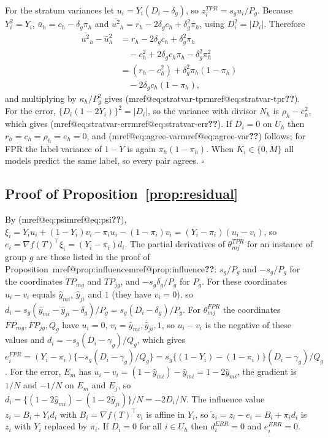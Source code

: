 \documentclass[pdflatex,sn-mathphys-num,iicol]{sn-jnl}
\makeatletter
\theoremstyle{thmstyleone}
\theoremstyle{thmstyletwo}
\theoremstyle{thmstylethree}
\newcommand{\Mref}[1]{\ifcsname mref@#1\endcsname\csname mref@#1\endcsname\else\textbf{??}\fi}
\makeatother
\begin{document}
For the stratum variances let $u_i=Y_i(D_i-\delta_g)$, so $z^{TPR}_i=s_gu_i/P_g$. Because
$Y_i^2=Y_i$, $\bar u_h=c_h-\delta_g\pi_h$ and $\overline{u^2}_h=r_h-2\delta_gc_h+\delta_g^2\pi_h$,
using $D_i^2=|D_i|$. Therefore
\begin{align*}
\overline{u^2}_h-\bar u_h^2&=r_h-2\delta_gc_h+\delta_g^2\pi_h\\
&\quad-c_h^2+2\delta_gc_h\pi_h-\delta_g^2\pi_h^2\\
&=(r_h-c_h^2)+\delta_g^2\pi_h(1-\pi_h)\\
&\quad-2\delta_gc_h(1-\pi_h),
\end{align*}
and multiplying by $\kappa_h/P_g^2$ gives (\Mref{eq:stratvar-tpr}). For the error,
$\{D_i(1-2Y_i)\}^2=|D_i|$, so the variance with divisor $N_h$ is $\rho_h-e_h^2$, which gives
(\Mref{eq:stratvar-err}). If $D_i=0$ on $U_h$ then $r_h=c_h=\rho_h=e_h=0$, and (\Mref{eq:agree-var})
follows; for FPR the label variance of $1-Y$ is again $\pi_h(1-\pi_h)$. When $K_i\in\{0,M\}$ all
models predict the same label, so every pair agrees. $\square$

\subsection{Proof of Proposition~\ref{prop:residual}}

By (\Mref{eq:psi}), $\xi_i=Y_iu_i+(1-Y_i)v_i-\pi_iu_i-(1-\pi_i)v_i=(Y_i-\pi_i)(u_i-v_i)$, so $e_i=\nabla f(T)^\top\xi_i=(Y_i-\pi_i)d_i$. The partial derivatives of
$\theta^{TPR}_{mj}$ for an instance of group $g$ are those listed in the proof of Proposition~\Mref{prop:influence}: $s_g/P_g$ and $-s_g/P_g$ for the coordinates $TP_{mg}$ and
$TP_{jg}$, and $-s_g\delta_g/P_g$ for $P_g$. For these coordinates $u_i-v_i$ equals $\hat y_{mi}$, $\hat y_{ji}$ and $1$ (they have $v_i=0$), so
$d_i=s_g(\hat y_{mi}-\hat y_{ji}-\delta_g)/P_g=s_g(D_i-\delta_g)/P_g$. For $\theta^{FPR}_{mj}$ the coordinates $FP_{mg},FP_{jg},Q_g$ have $u_i=0$, $v_i=\hat y_{mi},\hat y_{ji},1$,
so $u_i-v_i$ is the negative of these values and $d_i=-s_g(D_i-\gamma_g)/Q_g$, which gives $e^{FPR}_i=(Y_i-\pi_i)\{-s_g(D_i-\gamma_g)/Q_g\}=s_g\{(1-Y_i)-(1-\pi_i)\}(D_i-\gamma_g)/Q_g$. For the error,
$E_m$ has $u_i-v_i=(1-\hat y_{mi})-\hat y_{mi}=1-2\hat y_{mi}$, the gradient is $1/N$ and $-1/N$ on $E_m$ and $E_j$, so $d_i=\{(1-2\hat y_{mi})-(1-2\hat y_{ji})\}/N=-2D_i/N$. The influence value
$z_i=B_i+Y_id_i$ with $B_i=\nabla f(T)^\top v_i$ is affine in $Y_i$, so $\tilde z_i=z_i-e_i=B_i+\pi_id_i$ is $z_i$ with $Y_i$ replaced by $\pi_i$. If $D_i=0$ for all $i\in U_h$ then $d^{ERR}_i=0$ and $e^{ERR}_i=0$.
\end{document}
